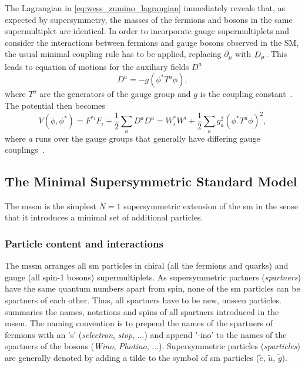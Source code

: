 The Lagrangian in \cref{eq:wess_zumino_lagrangian} immediately reveals that, as expected by supersymmetry, the masses of the fermions and bosons in the same supermultiplet are identical. In order to incorporate gauge supermultiplets and consider the interactions between fermions and gauge bosons observed in the SM, the usual minimal coupling rule has to be applied, replacing $\partial_\mu$ with $\mathop{}\!D_\mu$. This leads to equation of motions for the auxiliary fields $D^a$
\begin{equation}
	D^a = -g(\phi^*T^a\phi),
\end{equation}
where $T^a$ are the generators of the gauge group and $g$ is the coupling constant~\cite{Bustamante:2009us}. The potential then becomes
\begin{equation}
	V(\phi,\phi^*) = F^{*i}F_i + \frac{1}{2} \sum_a{D^aD^a} = W^*_iW^i + \frac{1}{2}\sum_a{g^2_a(\phi^*T^a\phi)^2} ,
\end{equation}
where $a$ runs over the gauge groups that generally have differing gauge couplings~\cite{Bustamante:2009us}.


 
\subsection{The Minimal Supersymmetric Standard Model}\label{sec:mssm_intro}

The \gls{mssm} is the simplest $N=1$ supersymmetric extension of the \gls{sm} in the sense that it introduces a minimal set of additional particles.

\subsubsection{Particle content and interactions}\label{sec:mssm_particle_content}

The \gls{mssm} arranges all \gls{sm} particles in chiral (all the fermions and quarks) and gauge (all spin-1 bosons) supermultiplets. As supersymmetric partners (\textit{spartners}) have the same quantum numbers apart from spin, none of the \gls{sm} particles can be spartners of each other.
Thus, all spartners have to be new, unseen particles.  summaries the names, notations and spins of all spartners introduced in the \gls{mssm}.
The naming convention is to prepend the names of the spartners of fermions with an 's' (\eg \textit{selectron}, \textit{stop}, ...) and append '-ino' to the names of the spartners of the bosons (\eg \textit{Wino}, \textit{Photino}, ...).
Supersymmetric particles (\textit{sparticles}) are generally denoted by adding a tilde to the symbol of \gls{sm} particles (\eg $\tilde{e}$, $\tilde{u}$, $\tilde{g}$). 

